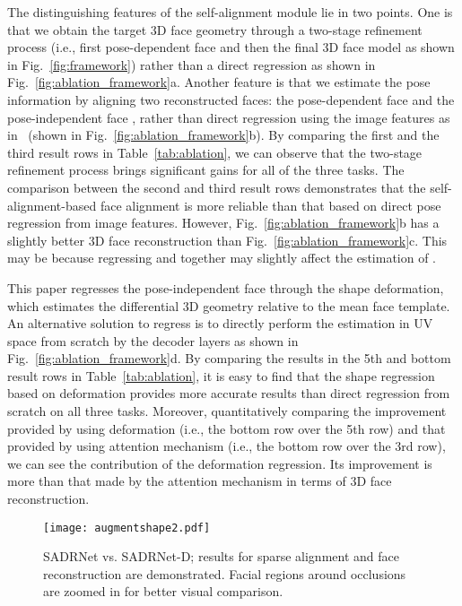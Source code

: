 \documentclass[journal]{IEEEtran}
\begin{document}
	
	
	{} The distinguishing features of the self-alignment module lie in two points. One is that we obtain the target 3D face geometry through a two-stage refinement process (i.e., first pose-dependent face  and then the final 3D face model  as shown in Fig.~\ref{fig:framework}) rather than a direct regression as shown in Fig.~\ref{fig:ablation_framework}a.
	Another feature is that we estimate the pose
	information by aligning two reconstructed faces: the pose-dependent face  and the pose-independent face , rather than direct regression using the image features as in~\cite{3DDFA} (shown in Fig.~\ref{fig:ablation_framework}b).
	By comparing the first and the third result rows
	in Table~\ref{tab:ablation}, we can observe that the two-stage refinement process brings significant gains for all of the three tasks.
	The comparison between the second and third result rows demonstrates that the self-alignment-based face alignment is more reliable than that based on direct pose regression from image features. However, Fig.~\ref{fig:ablation_framework}b has a slightly better 3D face reconstruction than Fig.~\ref{fig:ablation_framework}c. This may be because
	regressing  and  together may slightly affect the estimation of .
	
	
	{}
	This paper regresses the pose-independent face  through the shape deformation, which
	estimates the differential 3D geometry relative to the mean face template. An alternative solution to regress
	 is to directly perform the estimation in UV space from scratch by the decoder layers as shown in Fig.~\ref{fig:ablation_framework}d.
	By comparing the results in the 5th and bottom result rows in Table~\ref{tab:ablation},
	it is easy to find that the shape regression based on deformation provides more accurate results than direct regression from scratch on all three tasks.
	Moreover, quantitatively comparing the improvement provided by using deformation (i.e., the bottom row over the 5th row) and that provided by using attention mechanism (i.e., the bottom row over the 3rd row), we can see the contribution of the deformation regression. Its improvement is more than that made by the attention mechanism in terms of 3D face reconstruction.
	\begin{figure*}[hpt]
		\centering
		\texttt{[image: augmentshape2.pdf]}
		\caption{SADRNet vs. SADRNet-D; results for sparse alignment and face reconstruction are demonstrated. Facial regions around occlusions are zoomed in for better visual comparison.}
		\label{fig:aug}
	\end{figure*}
	
\end{document}
